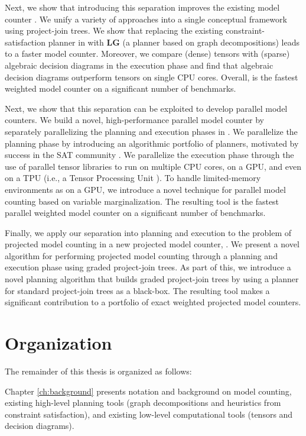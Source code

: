 Next, we show that introducing this separation improves the existing model counter  \cite{DPV20,phan2019weighted}. We unify a variety of approaches into a single conceptual framework using project-join trees. We show that replacing the existing constraint-satisfaction planner in  with \textbf{LG} (a planner based on graph decompositions) leads to a faster model counter. Moreover, we compare (dense) tensors with (sparse) algebraic decision diagrams in the execution phase and find that algebraic decision diagrams outperform tensors on single CPU cores. Overall,  is the fastest weighted model counter on a significant number of benchmarks.

Next, we show that this separation can be exploited to develop parallel model counters. We build a novel, high-performance parallel model counter  by separately parallelizing the planning and execution phases in . We parallelize the planning phase by introducing an algorithmic portfolio of planners, motivated by success in the SAT community \cite{XHHL08}. We parallelize the execution phase through the use of parallel tensor libraries to run on multiple CPU cores, on a GPU, and even on a TPU (i.e., a Tensor Processing Unit \cite{JYPPABBBBB17}). To handle limited-memory environments as on a GPU, we introduce a novel technique for parallel model counting based on variable marginalization. 
The resulting tool  is the fastest parallel weighted model counter on a significant number of benchmarks.

Finally, we apply our separation into planning and execution to the problem of projected model counting in a new projected model counter, . 
We present a novel algorithm for performing projected model counting through a planning and execution phase using graded project-join trees. As part of this, we introduce a novel planning algorithm that builds graded project-join trees by using a planner for standard project-join trees as a black-box. The resulting tool  makes a significant contribution to a portfolio of exact weighted projected model counters.

\section{Organization}
The remainder of this thesis is organized as follows:

Chapter \ref{ch:background} presents notation and background on model counting, existing high-level planning tools (graph decompositions and heuristics from constraint satisfaction), and existing low-level computational tools (tensors and decision diagrams). 

